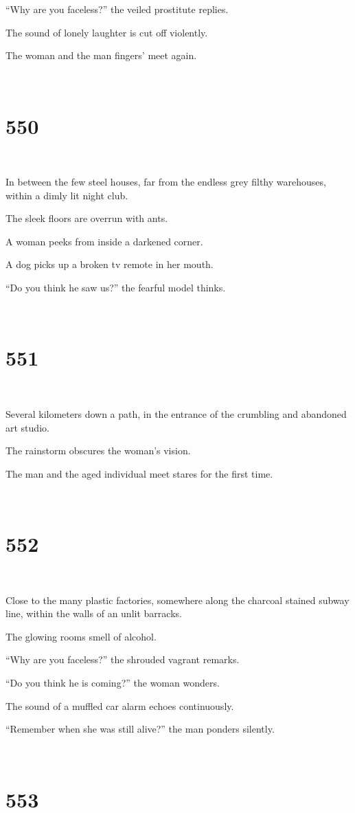 \documentclass{report}
\begin{document}
``Why are you faceless?'' the veiled prostitute replies.

The sound of lonely laughter is cut off violently.

The woman and the man fingers' meet again.

~
\chapter*{550}
~

In between the few steel houses, far from the endless grey filthy warehouses, within a dimly lit night club.

The sleek floors are overrun with ants.

A woman peeks from inside a darkened corner.

A dog picks up a broken tv remote in her mouth.

``Do you think he saw us?'' the fearful model thinks.

~
\chapter*{551}
~

Several kilometers down a path, in the entrance of the crumbling and abandoned art studio.

The rainstorm obscures the woman's vision.

The man and the aged individual meet stares for the first time.

~
\chapter*{552}
~

Close to the many plastic factories, somewhere along the charcoal stained subway line, within the walls of an unlit barracks.

The glowing rooms smell of alcohol.

``Why are you faceless?'' the shrouded vagrant remarks.

``Do you think he is coming?'' the woman wonders.

The sound of a muffled car alarm echoes continuously.

``Remember when she was still alive?'' the man ponders silently.

~
\chapter*{553}
~
\end{document}
